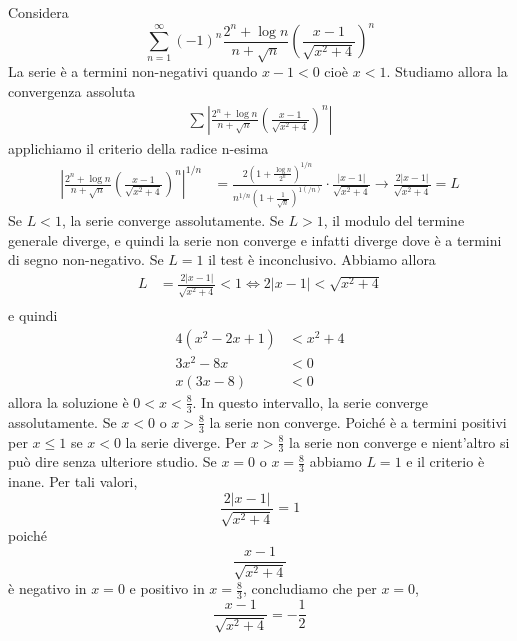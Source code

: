 \documentclass[a4paper]{article}
\begin{document}
\begin{snippetexample}{}
    Considera
    \[
        \sum_{n=1}^\infty {(-1)}^n \frac{2^n + \log n}{n+\sqrt{n}}
        {\left(
            \frac{x-1}{\sqrt{x^2 + 4}}
        \right)}^n
    \]
    La serie è a termini non-negativi quando
    \(x-1 < 0\) cioè \(x<1\).
    Studiamo allora la convergenza assoluta
    \begin{align*}
        \sum \left|\frac{2^n + \log n}{n+\sqrt{n}}
        {\left(
            \frac{x-1}{\sqrt{x^2 + 4}}
        \right)}^n\right|
    \end{align*}
    applichiamo il criterio della radice n-esima
    \begin{align*}
        {\left|
            \frac{2^n + \log n}{n+\sqrt{n}}
            {\left(
                \frac{x-1}{\sqrt{x^2 + 4}}
            \right)}^n
        \right|}^{1/n} &=
        \frac{2{\left(1 + \frac{\log n}{2^n}\right)}^{1/n}}{n^{1/n} {\left(1 + \frac{1}{\sqrt{n}}\right)}^{1(/n)}}
        \cdot \frac{|x-1|}{\sqrt{x^2 + 4}} \to \frac{2|x-1|}{\sqrt{x^2 + 4}} = L
    \end{align*}
    Se \(L<1\), la serie converge assolutamente.
    Se \(L>1\), il modulo del termine generale diverge, e quindi la serie non converge
    e infatti diverge dove è a termini di segno non-negativo.
    Se \(L=1\) il test è inconclusivo.
    Abbiamo allora
    \begin{align*}
        L &= \frac{2|x-1|}{\sqrt{x^2 + 4}} < 1 \iff 2|x-1| < \sqrt{x^2 + 4} \\
    \end{align*}
    e quindi
    \begin{align*}
        4(x^2 - 2x + 1) &< x^2 + 4 \\
        3x^2 - 8x &< 0 \\
        x(3x - 8) &< 0
    \end{align*}
    allora la soluzione è \(0 < x < \frac{8}{3}\). In questo intervallo,
    la serie converge assolutamente.
    Se \(x<0\) o \(x>\frac{8}{3}\) la serie non converge.
    Poiché è a termini positivi per \(x \leq 1\) se \(x<0\) la serie diverge.
    Per \(x>\frac{8}{3}\) la serie non converge e nient'altro si può dire senza ulteriore studio.
    Se \(x=0\) o \(x=\frac{8}{3}\) abbiamo \(L=1\) e il criterio è inane.
    Per tali valori,
    \[
        \frac{2|x-1|}{\sqrt{x^2 + 4}} = 1
    \]
    poiché
    \[
        \frac{x-1}{\sqrt{x^2+4}}
    \]
    è negativo in \(x=0\) e positivo in \(x=\frac{8}{3}\), concludiamo che
    per \(x=0\),
    \[
        \frac{x-1}{\sqrt{x^2+4}} = -\frac{1}{2}
\]
\end{snippetexample}
\end{document}
